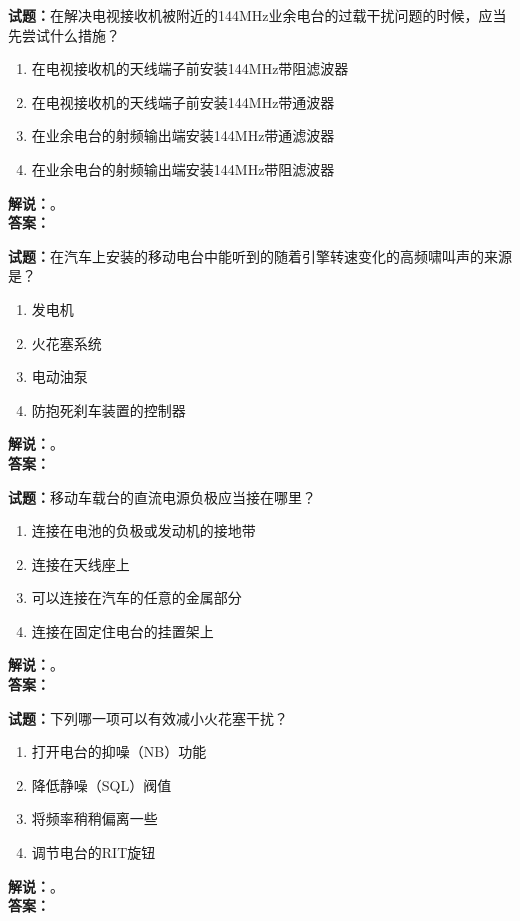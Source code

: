 \documentclass{ctexbook}
\begin{document}
\bigskip




\noindent\textbf{试题：}在解决电视接收机被附近的144\unit{\MHz}业余电台的过载干扰问题的时候，应当先尝试什么措施？
\begin{enumerate}[leftmargin=3em]
\item 在电视接收机的天线端子前安装144\unit{\MHz}带阻滤波器
\item 在电视接收机的天线端子前安装144\unit{\MHz}带通波器
\item 在业余电台的射频输出端安装144\unit{\MHz}带通滤波器
\item 在业余电台的射频输出端安装144\unit{\MHz}带阻滤波器
\end{enumerate}
\noindent\textbf{解说：}\textbf{}。\\\noindent\textbf{答案：}

\bigskip




\noindent\textbf{试题：}在汽车上安装的移动电台中能听到的随着引擎转速变化的高频啸叫声的来源是？
\begin{enumerate}[leftmargin=3em]
\item 发电机
\item 火花塞系统
\item 电动油泵
\item 防抱死刹车装置的控制器
\end{enumerate}
\noindent\textbf{解说：}\textbf{}。\\\noindent\textbf{答案：}

\bigskip




\noindent\textbf{试题：}移动车载台的直流电源负极应当接在哪里？
\begin{enumerate}[leftmargin=3em]
\item 连接在电池的负极或发动机的接地带
\item 连接在天线座上
\item 可以连接在汽车的任意的金属部分
\item 连接在固定住电台的挂置架上
\end{enumerate}
\noindent\textbf{解说：}\textbf{}。\\\noindent\textbf{答案：}

\bigskip




\noindent\textbf{试题：}下列哪一项可以有效减小火花塞干扰？
\begin{enumerate}[leftmargin=3em]
\item 打开电台的抑噪（NB）功能
\item 降低静噪（SQL）阀值
\item 将频率稍稍偏离一些
\item 调节电台的RIT旋钮
\end{enumerate}
\noindent\textbf{解说：}\textbf{}。\\\noindent\textbf{答案：}
\end{document}
